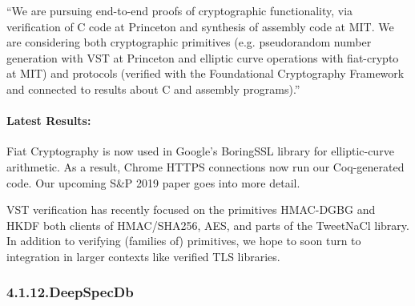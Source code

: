 \documentclass[12pt,twoside]{article}
\begin{document}
\noindent{}\textquotedblleft{}We are pursuing end-to-end proofs of cryptographic functionality, via
verification of C code at Princeton and synthesis of assembly code at
MIT.  We are considering both cryptographic primitives
(e.g. pseudorandom number generation with VST at Princeton and
elliptic curve operations with fiat-crypto at MIT) and protocols
(verified with the Foundational Cryptography Framework and connected
to results about C and assembly programs).\textquotedblright{}%

\paragraph{Latest Results:}%

\noindent{}Fiat Cryptography is now used in Google's BoringSSL library for
elliptic-curve arithmetic.  As a result, Chrome HTTPS connections now
run our Coq-generated code.  Our  upcoming S\&P 2019 paper goes into
more detail.%

VST verification has recently focused on the primitives HMAC-DGBG and
HKDF \textendash{} both clients of HMAC/SHA256, AES, and parts of the TweetNaCl
library. In addition to verifying (families of) primitives, we hope to
soon turn to integration in larger contexts like verified TLS
libraries.%

\subsubsection{4.1.12.\hspace*{0.5em}DeepSpecDb}%
\end{document}
